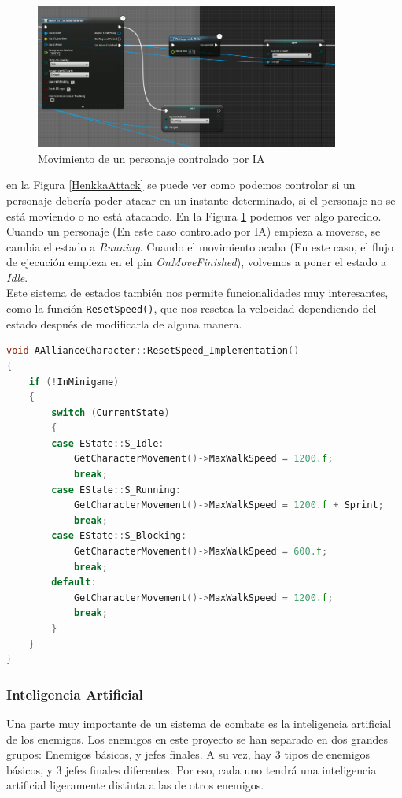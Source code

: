 \begin{figure}[H]
  \centering
  \includegraphics[width=10cm]{./images/Henkka_Move.png}
  \caption{Movimiento de un personaje controlado por IA}
  \label{HenkkaMove}
\end{figure}


en la Figura \ref{HenkkaAttack} se puede ver como podemos controlar si un personaje debería poder atacar en un instante determinado, si el personaje no se está moviendo o no está atacando. En la Figura \ref{HenkkaMove} podemos ver algo parecido. Cuando un personaje (En este caso controlado por \ac{IA}) empieza a moverse, se cambia el estado a \textit{Running}. Cuando el movimiento acaba (En este caso, el flujo de ejecución empieza en el pin \textit{OnMoveFinished}), volvemos a poner el estado a \textit{Idle}.
\\

Este sistema de estados también nos permite funcionalidades muy interesantes, como la función \texttt{ResetSpeed()}, que nos resetea la velocidad dependiendo del estado después de modificarla de alguna manera.

\begin{lstlisting}[language=c++,caption={},captionpos=b,label={ResetSpeed}]
void AAllianceCharacter::ResetSpeed_Implementation()
{
	if (!InMinigame)
	{
		switch (CurrentState)
		{
		case EState::S_Idle:
			GetCharacterMovement()->MaxWalkSpeed = 1200.f;
			break;
		case EState::S_Running:
			GetCharacterMovement()->MaxWalkSpeed = 1200.f + Sprint;
			break;
		case EState::S_Blocking:
			GetCharacterMovement()->MaxWalkSpeed = 600.f;
			break;
		default:
			GetCharacterMovement()->MaxWalkSpeed = 1200.f;
			break;
		}
	}
}
\end{lstlisting}


\subsubsection{Inteligencia Artificial}

Una parte muy importante de un sistema de combate es la inteligencia artificial de los enemigos. Los enemigos en este proyecto se han separado en dos grandes grupos: Enemigos básicos, y jefes finales. A su vez, hay 3 tipos de enemigos básicos, y 3 jefes finales diferentes. Por eso, cada uno tendrá una inteligencia artificial ligeramente distinta a las de otros enemigos.
\\

